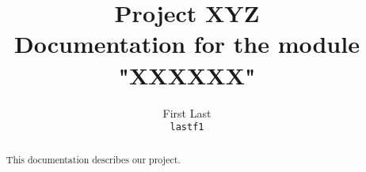 \documentclass[11pt,a4paper]{report}
\begin{document}
\title{\Huge\textsf{\textbf{Project XYZ}}\\
\vspace{30px}
\large{Documentation for the module "XXXXXX"}}
\author{
  First Last\\ \texttt{lastf1}
}

\maketitle

\begin{abstract}
This documentation describes our project.
\end{abstract}

\tableofcontents




\end{document}
